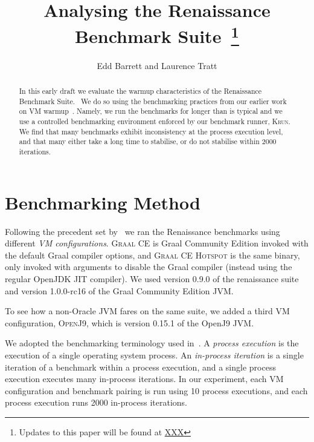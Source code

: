 \documentclass[a4paper]{article}
\newcommand{\krun}{\textsc{Krun}\xspace}
\newcommand{\graalce}{\textsc{Graal CE}\xspace}
\newcommand{\graalcehs}{\textsc{Graal CE Hotspot}\xspace}
\newcommand{\jnine}{\textsc{OpenJ9}\xspace}
\begin{document}
\title{Analysing the Renaissance Benchmark Suite~\footnote{Updates to this paper will be found at \url{XXX}}}

\author{Edd Barrett and Laurence Tratt}

\maketitle

\begin{abstract}
\noindent In this early draft we evaluate the warmup characteristics of the
Renaissance Benchmark Suite.~\cite{prokopec19renaissance} We do so using the
benchmarking practices from our earlier work on VM
warmup~\cite{barrett16warmup}. Namely, we run the benchmarks for longer than is
typical and we use a controlled benchmarking environment enforced by our
benchmark runner, \krun. We find that many benchmarks exhibit inconsistency at
the process execution level, and that many either take a long time to
stabilise, or do not stabilise within 2000 iterations.
\end{abstract}

\section{Benchmarking Method}
\label{sec:eval}

Following the precedent set by~\cite{prokopec19renaissance} we ran the
Renaissance benchmarks using different \emph{VM configurations}. \graalce is
Graal Community Edition invoked with the default Graal compiler options, and
\graalcehs is the same binary, only invoked with arguments to disable the Graal
compiler (instead using the regular OpenJDK JIT compiler). We used version 0.9.0
of the renaissance suite and version 1.0.0-rc16 of the Graal Community
Edition JVM.

To see how a non-Oracle JVM fares on the same suite, we added a third VM
configuration, \jnine, which is version 0.15.1 of the OpenJ9 JVM.

We adopted the benchmarking terminology used in~\cite{barrett16warmup}. A
\emph{process execution} is the execution of a single operating system process.
An \emph{in-process iteration} is a single iteration of a benchmark within a
process execution, and a single process execution executes many in-process
iterations. In our experiment, each VM configuration and benchmark pairing is
run using 10 process executions, and each process execution runs 2000
in-process iterations.
\end{document}
